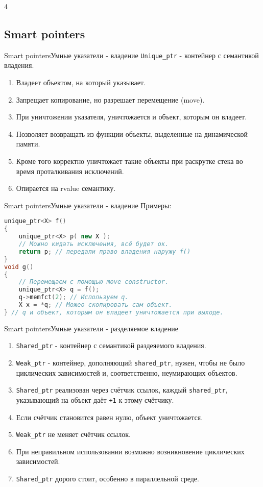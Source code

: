 4\documentclass[10pt]{beamer}
\begin{document}
\subsection{Smart pointers}
\hypertarget{Smart pointers}{}
\begin{frame}[fragile]{Smart pointers}{Умные указатели - владение}
\texttt{Unique\_ptr} - контейнер с семантикой владения. 
\begin{enumerate}
    \item Владеет объектом, на который указывает.
    \item Запрещает копирование, но разрешает перемещение (move). 
    \item При уничтожении указателя, уничтожается и объект, которым он владеет. 
    \item Позволяет возвращать из функции объекты, выделенные на динамической памяти.
    \item Кроме того корректно уничтожает такие объекты при раскрутке стека во время проталкивания исключений.
    \item Опирается на rvalue семантику.
\end{enumerate}
\end{frame}
\begin{frame}[fragile]{Smart pointers}{Умные указатели - владение}
Примеры:
\begin{lstlisting}[language=C++]
unique_ptr<X> f()
{
    unique_ptr<X> p( new X );
    // Можно кидать исключения, всё будет ок.
    return p; // передали право владения наружу f()
}
void g()
{
    // Перемещаем с помощью move constructor.
    unique_ptr<X> q = f(); 
    q->memfct(2); // Используем q.
    X x = *q; // Можео скопировать сам объект.
} // q и объект, которым он владеет уничтожается при выходе.
\end{lstlisting}
\end{frame}
\begin{frame}[fragile]{Smart pointers}{Умные указатели - разделяемое владение}
\begin{enumerate}
\item \texttt{Shared\_ptr} - контейнер с семантикой раздеяемого владения. 
\item \texttt{Weak\_ptr} - контейнер, дополняющий \texttt{shared\_ptr}, нужен, чтобы не было циклических зависимостей и, соответственно, неумирающих объектов.\\ 
\item \texttt{Shared\_ptr} реализован через счётчик ссылок, каждый \texttt{shared\_ptr}, указывающий на объект даёт \texttt{+1} к этому счётчику. 
\item Если счётчик становится равен нулю, объект уничтожается. 
\item \texttt{Weak\_ptr} не меняет счётчик ссылок.
\item При неправильном использовании возможно возникновение циклических зависимостей.
\item \texttt{Shared\_ptr} дорого стоит, особенно в параллельной среде.
\end{enumerate}
\end{frame}
\end{document}
